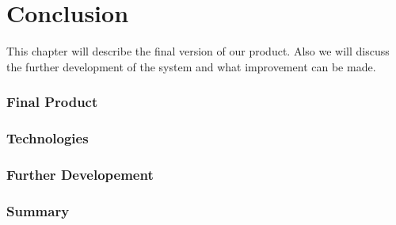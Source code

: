 \chapter{Conclusion}

\minitoc

This chapter will describe the final version of our product. Also we will discuss the further development of the system and what improvement can be made.

\clearpage

\subsection{Final Product}


\subsection{Technologies}


\subsection{Further Developement}


\subsection{Summary}


